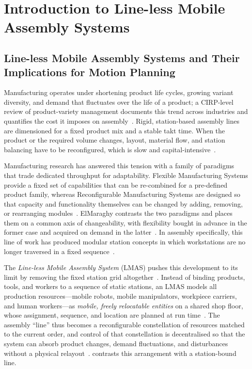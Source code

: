 \chapter{Introduction to Line-less Mobile Assembly Systems}
\label{ch:introduction}

\section{Line-less Mobile Assembly Systems and Their Implications for
  Motion Planning}
\label{sec:lmas}

Manufacturing operates under shortening product life cycles, growing
variant diversity, and demand that fluctuates over the life of a
product; a CIRP-level review of product-variety management documents
this trend across industries and quantifies the cost it imposes on
assembly~\cite{ElMaraghy2013Variety}. Rigid, station-based assembly
lines are dimensioned for a fixed product mix and a stable takt time.
When the product or the required volume changes, layout, material flow,
and station balancing have to be reconfigured, which is slow and
capital-intensive~\cite{Huettemann2016LMAS}.

Manufacturing research has answered this tension with a family of
paradigms that trade dedicated throughput for adaptability. Flexible
Manufacturing Systems provide a fixed set of capabilities that can be
re-combined for a pre-defined product family, whereas Reconfigurable
Manufacturing Systems are designed so that capacity and functionality
themselves can be changed by adding, removing, or rearranging
modules~\cite{Koren1999RMS}. ElMaraghy contrasts the two paradigms and
places them on a common axis of changeability, with flexibility bought
in advance in the former case and acquired on demand in the
latter~\cite{ElMaraghy2005FRMS}. In assembly specifically, this line of
work has produced modular station concepts in which workstations are no
longer traversed in a fixed sequence~\cite{Kern2016Modular}.

The \emph{Line-less Mobile Assembly System} (LMAS) pushes this
development to its limit by removing the fixed station grid
altogether~\cite{Huettemann2019LMAS}. Instead of binding products,
tools, and workers to a sequence of static stations, an LMAS models all
production resources---mobile robots, mobile manipulators, workpiece
carriers, and human workers---as \emph{mobile, freely relocatable
entities} on a shared shop floor, whose assignment, sequence, and
location are planned at run time~\cite{Buckhorst2019Planning}. The
assembly ``line'' thus becomes a reconfigurable constellation of
resources matched to the current order, and control of that
constellation is decentralised so that the system can absorb product
changes, demand fluctuations, and disturbances without a physical
relayout~\cite{Buckhorst2022LMAS}.  contrasts
this arrangement with a station-bound line.

